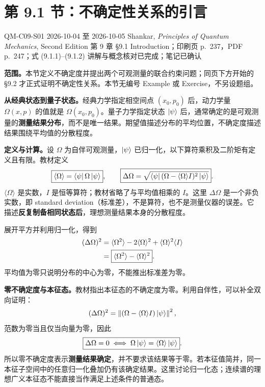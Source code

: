 \section{第 9.1 节：不确定性关系的引言}
\label{section:QM-C09-S01}
\studymeta
  {QM-C09-S01}
  {2026-10-04 至 2026-10-05}
  {Shankar, \textit{Principles of Quantum Mechanics}, Second Edition}
  {第 9 章 \S 9.1 Introduction；印刷页 p.~237，PDF p.~247；式 (9.1.1)--(9.1.2)}
  {讲解与概念核对已完成；笔记已确认}

\textbf{范围。}本节定义不确定度并提出两个可观测量的联合约束问题；同页下方开始的 \S 9.2 才正式证明不确定性关系。本节无编号 Example 或 Exercise，不另设题组。

\textbf{从经典状态到量子状态。}经典力学指定相空间点 $(x_0,p_0)$ 后，动力学量 $\Omega(x,p)$ 的值就是 $\Omega(x_0,p_0)$。量子力学指定状态 $\left|\psi\right\rangle$ 后，通常确定的是可观测量的\textbf{测量结果分布}，而不是唯一结果。期望值描述分布的平均位置，不确定度描述结果围绕平均值的分散程度。

\textbf{定义与计算。}设 $\Omega$ 为自伴可观测量，$\left|\psi\right\rangle$ 已归一化，以下算符乘积及二阶矩有定义且有限。教材定义
\begin{equation}
  \boxed{\langle\Omega\rangle=\left\langle \psi\right|\Omega\left|\psi\right\rangle},\qquad
  \boxed{\Delta\Omega=
    \sqrt{\left\langle \psi\right|(\Omega-\langle\Omega\rangle I)^2\left|\psi\right\rangle}}.
  \label{eq:QM-C09-S01-definition}
\end{equation}
$\langle\Omega\rangle$ 是实数，$I$ 是恒等算符；教材省略了与平均值相乘的 $I$。这里 $\Delta\Omega$ 是一个非负实数，即 standard deviation（标准差），不是算符，也不是测量仪器的误差。它描述\textbf{反复制备相同状态后}，理想测量结果本身的分散程度。

展开平方并利用归一化，得到
\begin{align}
  (\Delta\Omega)^2
    &=\langle\Omega^2\rangle
      -2\langle\Omega\rangle^2+\langle\Omega\rangle^2\langle I\rangle\notag\\
    &=\boxed{\langle\Omega^2\rangle-\langle\Omega\rangle^2}.
  \label{eq:QM-C09-S01-variance}
\end{align}
平均值为零只说明分布的中心为零，不能推出标准差为零。

\textbf{零不确定度与本征态。}教材指出本征态的不确定度为零。利用自伴性，可以补全双向证明：
\begin{equation}
  (\Delta\Omega)^2
    =\left\|(\Omega-\langle\Omega\rangle I)\left|\psi\right\rangle\right\|^2,
\end{equation}
范数为零当且仅当向量为零，因此
\begin{equation}
  \boxed{\Delta\Omega=0
    \iff \Omega\left|\psi\right\rangle=\langle\Omega\rangle\left|\psi\right\rangle}.
  \label{eq:QM-C09-S01-zero-uncertainty}
\end{equation}
所以零不确定度表示\textbf{测量结果确定}，并不要求该结果等于零。若本征值简并，同一本征子空间中的任意归一化叠加仍有该确定结果。这里讨论归一化态；连续谱的理想广义本征态不能直接当作满足上述条件的普通态。

